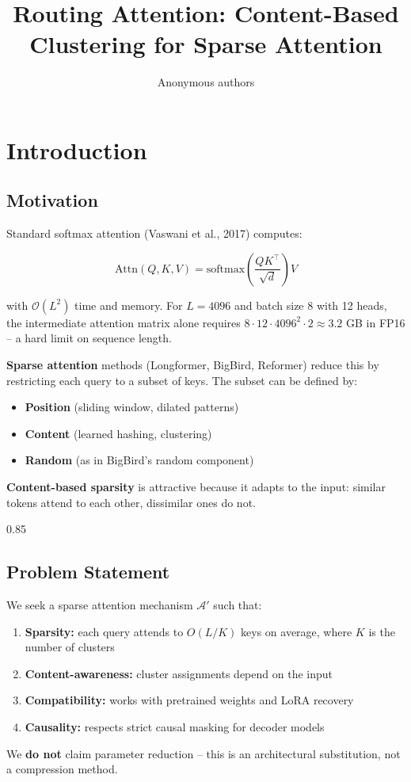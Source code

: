 \title{\textbf{Routing Attention: Content-Based Clustering for Sparse Attention}}

\author{Anonymous authors}



\section{Introduction}

\subsection{Motivation}

Standard softmax attention (Vaswani et al., 2017) computes:

\[
\text{Attn}(Q, K, V) = \text{softmax}\!\left(\frac{Q K^\top}{\sqrt{d}}\right) V
\tag{1.1}
\]

with $\mathcal{O}(L^2)$ time and memory. For $L = 4096$ and batch size 8 with 
12 heads, the intermediate attention matrix alone requires 
$8 \cdot 12 \cdot 4096^2 \cdot 2 \approx 3.2$ GB in FP16 -- a hard limit on 
sequence length.

\textbf{Sparse attention} methods (Longformer, BigBird, Reformer) reduce this by 
restricting each query to a subset of keys. The subset can be defined by:

\begin{itemize}
\item \textbf{Position} (sliding window, dilated patterns)
\item \textbf{Content} (learned hashing, clustering)
\item \textbf{Random} (as in BigBird's random component)

\end{itemize}
\textbf{Content-based sparsity} is attractive because it adapts to the input: 
similar tokens attend to each other, dissimilar ones do not.

0.85


\subsection{Problem Statement}

We seek a sparse attention mechanism $\mathcal{A}'$ such that:

\begin{enumerate}
\item \textbf{Sparsity:} each query attends to $O(L/K)$ keys on average, where $K$
  is the number of clusters
\item \textbf{Content-awareness:} cluster assignments depend on the input
\item \textbf{Compatibility:} works with pretrained weights and LoRA recovery
\item \textbf{Causality:} respects strict causal masking for decoder models

\end{enumerate}
We \textbf{do not} claim parameter reduction -- this is an architectural 
substitution, not a compression method.

